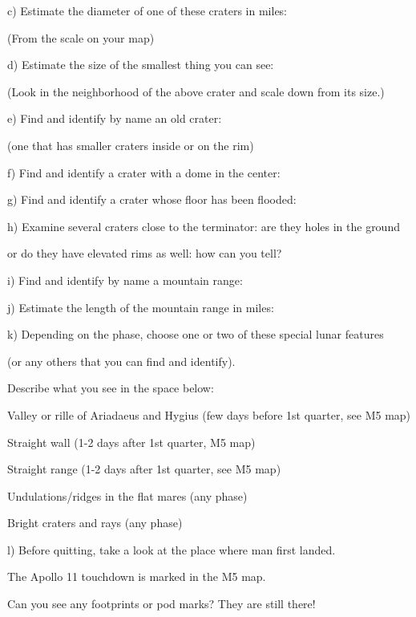 \medskip
c) Estimate the diameter of one of these craters in miles:\hfill
\makebox[4cm]{\hrulefill}

(From the scale on your map)

\medskip
d) Estimate the size of the smallest thing you can see: \hfill
\makebox[4cm]{\hrulefill}

(Look in the neighborhood of the above crater and scale down from its size.)

\medskip
e) Find and identify by name an old crater: \hfill
\makebox[4cm]{\hrulefill}

(one that has smaller craters inside or on the rim)

\medskip
f) Find and identify a crater with a dome in the center: \hfill \makebox[4cm]{\hrulefill}

\medskip
g) Find and identify a crater whose floor has been flooded:
\hfill \makebox[4cm]{\hrulefill}


\medskip
h) Examine several craters close to the terminator: are they holes in
the ground 

or do they have elevated rims as well: how can you tell? 
\hfill \makebox[4cm]{\hrulefill}

\medskip
i) Find and identify by name a mountain range: \hfill
\makebox[4cm]{\hrulefill}


\medskip
j) Estimate the length of the mountain range in miles: \hfill
\makebox[4cm]{\hrulefill}


\medskip
k) Depending on the phase, choose one or two of these special lunar
features 

(or any others that you can find and identify).

Describe what you see in the space below: 

\smallskip
Valley or rille of Ariadaeus and Hygius (few days before 1st quarter, see M5
map) 

\smallskip
Straight wall (1-2 days after 1st quarter, M5 map)

\smallskip
Straight range (1-2 days after 1st quarter, see M5 map)

\smallskip
Undulations/ridges in the flat mares (any phase)

\smallskip
Bright craters and rays (any phase)

\medskip
l) Before quitting, take a look at the place where man first landed. 

The Apollo 11 touchdown is marked in the M5 map. 

Can you see any footprints or pod marks? They are still there!

\bigskip 
       


